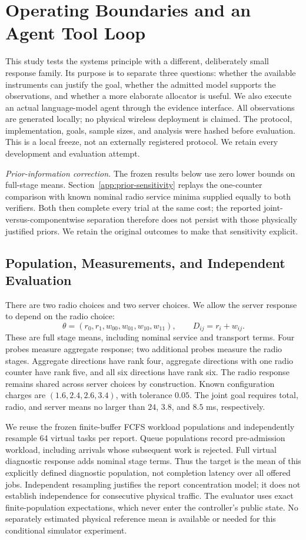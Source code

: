\section{Operating Boundaries and an Agent Tool Loop}
\label{app:operating-study}

This study tests the systems principle with a different, deliberately small
response family. Its purpose is to separate three questions: whether the
available instruments can justify the goal, whether the admitted model
supports the observations, and whether a more elaborate allocator is useful.
We also execute an actual language-model agent through the evidence interface.
All observations are generated locally; no physical wireless deployment is
claimed. The protocol, implementation, goals, sample sizes, and analysis were
hashed before evaluation. This is a local freeze, not an externally registered
protocol. We retain every development and evaluation attempt.

\emph{Prior-information correction.} The frozen results below use zero
lower bounds on full-stage means. Section~\ref{app:prior-sensitivity}
replays the one-counter comparison with known nominal radio service minima
supplied equally to both verifiers. Both then complete every trial at the
same cost; the reported joint-versus-componentwise separation therefore
does not persist with those physically justified priors. We retain the
original outcomes to make that sensitivity explicit.

\subsection{Population, Measurements, and Independent Evaluation}

There are two radio choices and two server choices. We allow the server
response to depend on the radio choice:
$$
\theta=(r_0,r_1,w_{00},w_{01},w_{10},w_{11}),
\qquad D_{ij}=r_i+w_{ij}.
$$
These are full stage means, including nominal service and transport terms.
Four probes measure aggregate response; two additional probes measure the
radio stages. Aggregate directions have rank four, aggregate directions with
one radio counter have rank five, and all six directions have rank six.
The radio response remains shared across server choices by construction.
Known configuration charges are $(1.6,2.4,2.6,3.4)$, with tolerance $0.05$.
The joint goal requires total, radio, and server means no larger than
$24$, $3.8$, and $8.5$ ms, respectively.

We reuse the frozen finite-buffer FCFS workload populations and independently
resample 64 virtual tasks per report. Queue populations record pre-admission
workload, including arrivals whose subsequent work is rejected. Full virtual
diagnostic response adds nominal stage terms. Thus the target is the mean of
this explicitly defined diagnostic population, not completion latency over
all offered jobs. Independent resampling justifies the report concentration
model; it does not establish independence for consecutive physical traffic.
The evaluator uses exact finite-population expectations, which never enter
the controller's public state. No separately estimated physical reference
mean is available or needed for this conditional simulator experiment.

